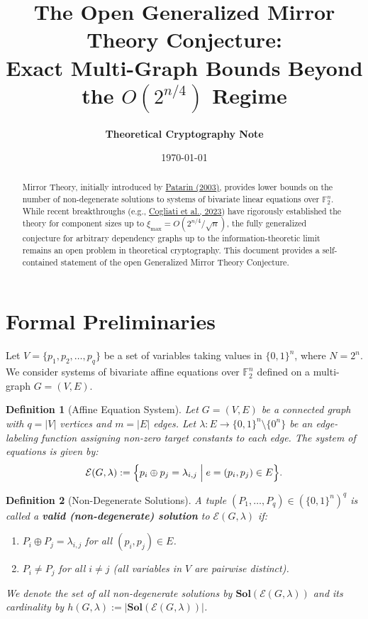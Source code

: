 \documentclass[11pt,a4paper]{article}
\title{\textbf{\Large The Open Generalized Mirror Theory Conjecture:}\\[0.2em] \Large Exact Multi-Graph Bounds Beyond the $O(2^{n/4})$ Regime}
\author{\textbf{Theoretical Cryptography Note}}
\date{\today}
\newtheorem{definition}{Definition}
\begin{document}
\maketitle

\begin{abstract}
Mirror Theory, initially introduced by \href{https://iacr.org/archive/crypto2003/27290510/27290510.pdf}{Patarin (2003)}, provides lower bounds on the number of non-degenerate solutions to systems of bivariate linear equations over $\mathbb{F}_2^n$. While recent breakthroughs (e.g., \href{https://eprint.iacr.org/2022/686}{Cogliati et al., 2023}) have rigorously established the theory for component sizes up to $\xi_{\max} = O(2^{n/4}/\sqrt{n})$, the fully generalized conjecture for arbitrary dependency graphs up to the information-theoretic limit remains an open problem in theoretical cryptography. This document provides a self-contained statement of the open Generalized Mirror Theory Conjecture.
\end{abstract}

\section{Formal Preliminaries}

Let $V = \{p_1, p_2, \dots, p_q\}$ be a set of variables taking values in $\{0,1\}^n$, where $N = 2^n$. We consider systems of bivariate affine equations over $\mathbb{F}_2^n$ defined on a multi-graph $G = (V, E)$.

\begin{definition}[Affine Equation System]
Let $G = (V, E)$ be a connected graph with $q = |V|$ vertices and $m = |E|$ edges. Let $\lambda : E \to \{0,1\}^n \setminus \{0^n\}$ be an edge-labeling function assigning non-zero target constants to each edge. The system of equations is given by:
\begin{equation}
\mathcal{E}(G, \lambda) := \Bigl\{ p_i \oplus p_j = \lambda_{i,j} \;\Big|\; e = (p_i, p_j) \in E \Bigr\}.
\end{equation}
\end{definition}

\begin{definition}[Non-Degenerate Solutions]
A tuple $(P_1, \dots, P_q) \in (\{0,1\}^n)^q$ is called a \textbf{valid (non-degenerate) solution} to $\mathcal{E}(G, \lambda)$ if:
\begin{enumerate}[label=\roman*.]
    \item $P_i \oplus P_j = \lambda_{i,j}$ for all $(p_i, p_j) \in E$.
    \item $P_i \neq P_j$ for all $i \neq j$ (all variables in $V$ are pairwise distinct).
\end{enumerate}
We denote the set of all non-degenerate solutions by $\mathbf{Sol}(\mathcal{E}(G, \lambda))$ and its cardinality by $h(G, \lambda) := |\mathbf{Sol}(\mathcal{E}(G, \lambda))|$.
\end{definition}
\end{document}
